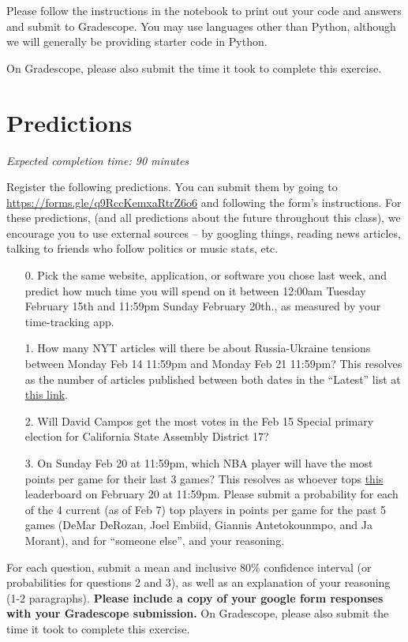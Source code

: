 \documentclass[11pt]{article}
\begin{document}
Please follow the instructions in the notebook to print out your code and answers and submit to Gradescope. You may use languages other than Python, although we will generally be providing starter code in Python.

On Gradescope, please also submit the time it took to complete this exercise.

\section*{Predictions}

\emph{Expected completion time: 90 minutes}

Register the following predictions. You can submit them by going to \url{https://forms.gle/q9RccKemxaRtrZ6o6} and following the form's instructions. For these predictions, (and all predictions about the future throughout this class), we encourage you to use external sources -- by googling things, reading news articles, talking to friends who follow politics or music stats, etc.

\begin{enumerate}
	\item[0.] Pick the same website, application, or software you chose last week, and predict how much time you will spend on it between 12:00am Tuesday February 15th and 11:59pm Sunday February 20th., as measured by your time-tracking app.

	\item[1.] How many NYT articles will there be about Russia-Ukraine tensions between Monday Feb 14 11:59pm and Monday Feb 21 11:59pm? This resolves as the number of articles published between both dates in the ``Latest'' list at \href{https://www.nytimes.com/news-event/ukraine-russia?name=styln-russia-ukraine&region=TOP_BANNER&block=storyline_menu_recirc&action=click&pgtype=LegacyCollection&variant=0_Control}{this link}.

	\item[2.] Will David Campos get the most votes in the Feb 15 Special primary election for California State Assembly District 17?
 
	\item[3.] On Sunday Feb 20 at 11:59pm, which NBA player will have the most points per game for their last 3 games? This resolves as whoever tops \href{https://www.nba.com/stats/players/traditional/?sort=PTS&dir=-1&Season=2021-22&SeasonType=Regular%20Season&LastNGames=3}{this} leaderboard on February 20 at 11:59pm. Please submit a probability for each of the 4 current (as of Feb 7) top players in points per game for the past 5 games (DeMar DeRozan, Joel Embiid, Giannis Antetokounmpo, and Ja Morant), and for ``someone else'', and your reasoning. 
\end{enumerate}

For each question, submit a mean and inclusive 80\% confidence interval (or probabilities for questions 2 and 3), as well as an explanation of your reasoning (1-2 paragraphs). \textbf{Please include a copy of your google form responses with your Gradescope submission.} On Gradescope, please also submit the time it took to complete this exercise.
\end{document}
